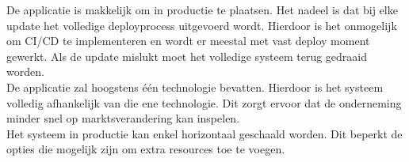 De applicatie is makkelijk om in productie te plaatsen. Het nadeel is dat bij elke update het volledige deployprocess uitgevoerd wordt. Hierdoor is het onmogelijk om CI/CD te implementeren en wordt er meestal met vast deploy moment gewerkt. Als de update mislukt moet het volledige systeem terug gedraaid worden.\\
De applicatie zal hoogstens één technologie bevatten. Hierdoor is het systeem volledig afhankelijk van die ene technologie. Dit zorgt ervoor dat de onderneming minder snel op marktsverandering kan inspelen.\\
Het systeem in productie kan enkel horizontaal geschaald worden. Dit beperkt de opties die mogelijk zijn om extra resources toe te voegen. 


